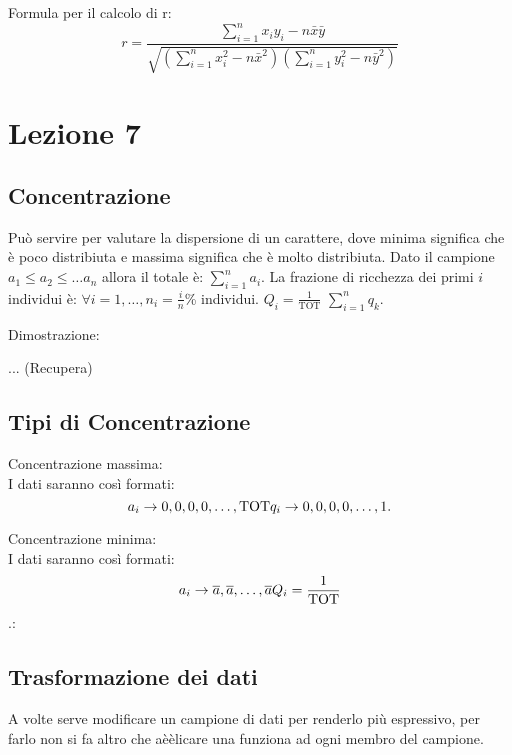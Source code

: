 \documentclass{article}
\begin{document}
Formula per il calcolo di r: 
  $$r = \frac{\sum_{i=1}^{n} x_i y_i - n \bar{x} \bar{y}}{\sqrt{\left(\sum_{i=1}^{n} x_i^2 - n \bar{x}^2\right) \left(\sum_{i=1}^{n} y_i^2 - n \bar{y}^2\right)}}$$



\section*{Lezione 7}


\subsection*{Concentrazione}

Può servire per valutare la dispersione di un carattere, dove minima significa che è poco distribiuta e massima significa che è molto distribiuta. Dato il campione $a_1 \le a_2 \le \dots a_n$ allora il totale è: $\sum_{i=1}^na_i$. La frazione di ricchezza dei primi $i$ individui è: $\forall i=1,\dots,n _i=\frac{i}{n}$\% individui. $Q_i=\frac{1}{\text{TOT}}$ $\sum_{i=1}^nq_k$.

\begin{tcolorbox}
   
  Dimostrazione:

  ... (Recupera)
    
\end{tcolorbox}

\subsection*{Tipi di Concentrazione}

Concentrazione massima: \\

I dati saranno così formati: $$a_i \to 0,0,0,0,\dots,\text{TOT}\\ q_i \to 0,0,0,0,\dots,1.$$ 

Concentrazione minima: \\

I dati saranno così formati: $$a_i \to \overline{a},\overline{a},\dots,\overline{a} \\ Q_i=\frac{1}{\text{TOT}}$$.:

\subsection*{Trasformazione dei dati}

A volte serve modificare un campione di dati per renderlo più espressivo, per farlo non si fa altro che aèèlicare una funziona ad ogni membro del campione.
\end{document}
